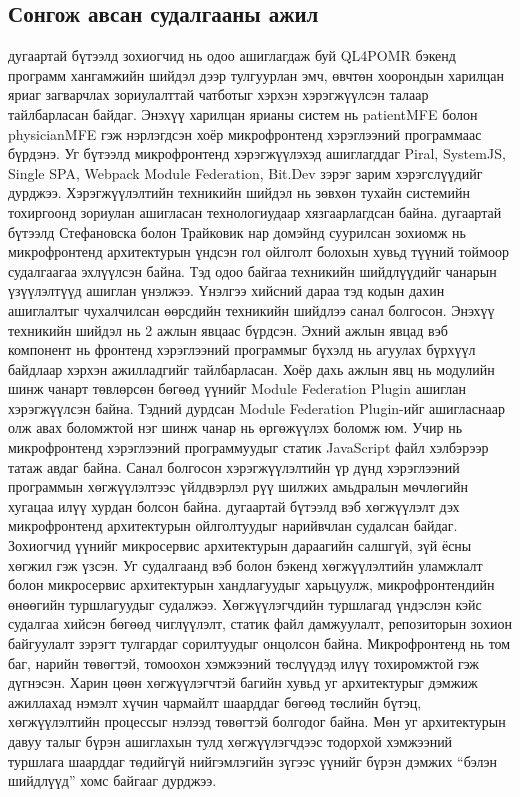 \subsection{Сонгож авсан судалгааны ажил}
\cite{mohammed2022} дугаартай бүтээлд зохиогчид нь одоо ашиглагдаж буй QL4POMR бэкенд программ хангамжийн шийдэл дээр тулгуурлан эмч, өвчтөн хоорондын харилцан яриаг загварчлах зориулалттай чатботыг хэрхэн хэрэгжүүлсэн талаар тайлбарласан байдаг. Энэхүү харилцан ярианы систем нь patientMFE болон physicianMFE гэж нэрлэгдсэн хоёр микрофронтенд хэрэглээний программаас бүрдэнэ. Уг бүтээлд микрофронтенд хэрэгжүүлэхэд ашиглагддаг Piral, SystemJS, Single SPA, Webpack Module Federation, Bit.Dev зэрэг зарим хэрэгслүүдийг дурджээ. Хэрэгжүүлэлтийн техникийн шийдэл нь зөвхөн тухайн системийн тохиргоонд зориулан ашигласан технологиудаар хязгаарлагдсан байна.
\newline
\hspace*{0.6cm}\cite{stefanovska2022} дугаартай бүтээлд Стефановска болон Трайковик нар домэйнд суурилсан зохиомж нь микрофронтенд архитектурын үндсэн гол ойлголт болохын хувьд түүний тоймоор судалгаагаа эхлүүлсэн байна. Тэд одоо байгаа техникийн шийдлүүдийг чанарын үзүүлэлтүүд ашиглан үнэлжээ. Үнэлгээ хийсний дараа тэд кодын дахин ашиглалтыг чухалчилсан өөрсдийн техникийн шийдлээ санал болгосон. Энэхүү техникийн шийдэл нь 2 ажлын явцаас бүрдсэн. Эхний ажлын явцад вэб компонент нь фронтенд хэрэглээний программыг бүхэлд нь агуулах бүрхүүл байдлаар хэрхэн ажилладгийг тайлбарласан. Хоёр дахь ажлын явц нь модулийн шинж чанарт төвлөрсөн бөгөөд үүнийг Module Federation Plugin ашиглан хэрэгжүүлсэн байна. Тэдний дурдсан Module Federation Plugin-ийг ашигласнаар олж авах боломжтой нэг шинж чанар нь өргөжүүлэх боломж юм. Учир нь микрофронтенд хэрэглээний программуудыг статик JavaScript файл хэлбэрээр татаж авдаг байна. Санал болгосон хэрэгжүүлэлтийн үр дүнд хэрэглээний программын хөгжүүлэлтээс үйлдвэрлэл рүү шилжих амьдралын мөчлөгийн хугацаа илүү хурдан болсон байна.
\newline
\hspace*{0.6cm}\cite{pavlenko2020} дугаартай бүтээлд вэб хөгжүүлэлт дэх микрофронтенд архитектурын ойлголтуудыг нарийвчлан судалсан байдаг. Зохиогчид үүнийг микросервис архитектурын дараагийн салшгүй, зүй ёсны хөгжил гэж үзсэн. Уг судалгаанд вэб болон бэкенд хөгжүүлэлтийн уламжлалт болон микросервис архитектурын хандлагуудыг харьцуулж, микрофронтендийн өнөөгийн туршлагуудыг судалжээ. Хөгжүүлэгчдийн туршлагад үндэслэн кэйс судалгаа хийсэн бөгөөд чиглүүлэлт, статик файл дамжуулалт, репозиторын зохион байгуулалт зэрэгт тулгардаг сорилтуудыг онцолсон байна. Микрофронтенд нь том баг, нарийн төвөгтэй, томоохон хэмжээний төслүүдэд илүү тохиромжтой гэж дүгнэсэн. Харин цөөн хөгжүүлэгчтэй багийн хувьд уг архитектурыг дэмжиж ажиллахад нэмэлт хүчин чармайлт шаарддаг бөгөөд төслийн бүтэц, хөгжүүлэлтийн процессыг нэлээд төвөгтэй болгодог байна. Мөн уг архитектурын давуу талыг бүрэн ашиглахын тулд хөгжүүлэгчдээс тодорхой хэмжээний туршлага шаарддаг төдийгүй нийгэмлэгийн зүгээс үүнийг бүрэн дэмжих ``бэлэн шийдлүүд'' хомс байгааг дурджээ.
